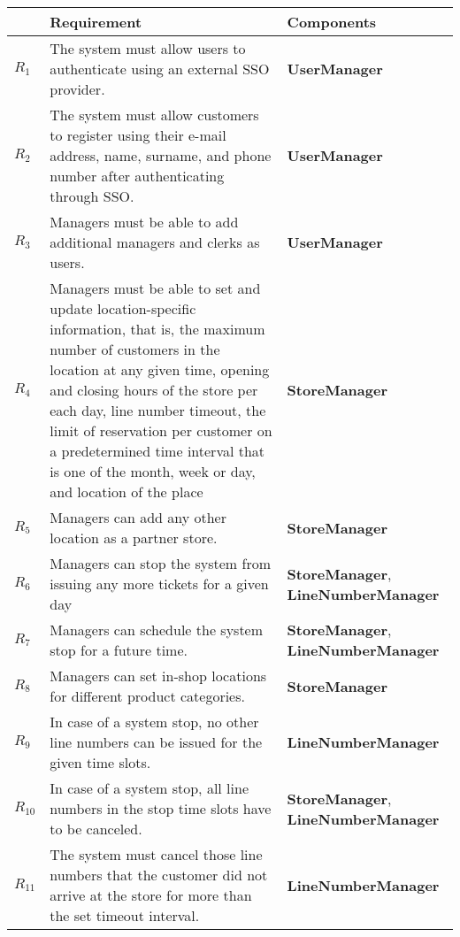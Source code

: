 \begin{table}[h]
    \begin{tabular}{|p{2cm}|p{10cm}|p{4cm}|}
        \hline
        & Requirement & Components \\ \hline
        $R_{1}$ & The system must allow users to authenticate using an external SSO provider. &  \textbf{UserManager} \\ \hline
        $R_{2}$ & The system must allow customers to register using their e-mail address, name, surname, and phone number after authenticating through SSO. & \textbf{UserManager} \\ \hline
        $R_{3}$ & Managers must be able to add additional managers and clerks as users. & \textbf{UserManager} \\ \hline
        $R_{4}$ & Managers must be able to set and update location-specific information, that is, the maximum number of customers in the location at any given time, opening and closing hours of the store per each day, line number timeout, the limit of reservation per customer on a predetermined time interval that is one of the month, week or day, and location of the place & \textbf{StoreManager} \\ \hline
        $R_{5}$ & Managers can add any other location as a partner store. & \textbf{StoreManager} \\ \hline
        $R_{6}$ & Managers can stop the system from issuing any more tickets for a given day & \textbf{StoreManager}, \textbf{LineNumberManager} \\ \hline
        $R_{7}$ & Managers can schedule the system stop for a future time. & \textbf{StoreManager}, \textbf{LineNumberManager} \\ \hline
        $R_{8}$ & Managers can set in-shop locations for different product categories. & \textbf{StoreManager} \\ \hline
        $R_{9}$ & In case of a system stop, no other line numbers can be issued for the given time slots. & \textbf{LineNumberManager} \\ \hline
        $R_{10}$ & In case of a system stop, all line numbers in the stop time slots have to be canceled. &  \textbf{StoreManager}, \textbf{LineNumberManager} \\ \hline
        $R_{11}$ & The system must cancel those line numbers that the customer did not arrive at the store for more than the set timeout interval. & \textbf{LineNumberManager} \\ \hline

\end{tabular}
\end{table}
